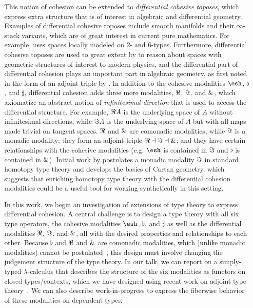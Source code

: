 \documentclass{article}
\begin{document}
This notion of cohesion can be extended to \emph{differential cohesive
  toposes}, which express extra structure that is of interest in
algebraic and differential geometry.  Examples of differential cohesive
toposes include smooth manifolds and their $\infty$-stack variants,
which are of great interest in current pure mathematics. For example,
\citet{SatiSchreiberStasheff2012} uses spaces locally modeled on 2- and
6-types.  Furthermore, differential cohesive toposes are used to great
extent by \citet{Schreiber2013} to reason about spaces with geometric
structures of interest to modern physics, and the differential part of
differential cohesion plays an important part in algebraic geometry, as
first noted in the form of an adjoint triple by \citet{SimpsonTeleman}.
In addition to the cohesive modalities $\shape$, $\flat$, and $\sharp$,
differential cohesion adds three more modalities, $\Re$, $\Im$, and
$\&$, which axiomatize an abstract notion of \emph{infinitesimal
  direction} that is used to access the differential structure.  For
example, $\Re A$ is the underlying space of $A$ without infinitesimal
directions, while $\Im A$ is the underlying space of $A$ but with all
maps made trivial on tangent spaces.  $\Re$ and $\&$ are comonadic
modalities, while $\Im$ is a monadic modality; they form an adjoint
triple $\Re \dashv \Im \dashv \&$; and they have certain
relationships with the cohesive modalities (e.g. $\shape$ is contained
in $\Im$ and $\flat$ is contained in $\&$).  Initial work by
\citet{Wellen2017} postulates a monadic modality $\Im$ in standard
homotopy type theory and develops the basics of Cartan geometry, which
suggests that enriching homotopy type theory with the differential
cohesion modalities could be a useful tool for working synthetically in
this setting.
 

In this work, we begin an investigation of extensions of type theory to
express differential cohesion.  A central challenge is to design a type
theory with all six type operators, the cohesive modalities $\shape$,
$\flat$, and $\sharp$ as well as the differential modalities $\Re$,
$\Im$, and $\&$, all with the desired properties and relationships
to each other.  Because $\flat$ and $\Re$ and $\&$ are comonadic
modalities, which (unlike monadic modalities) cannot be
postulated~\citep{Shulman2015}, this design must involve changing the
judgement structure of the type theory.  In our talk, we can report on a
simply-typed $\lambda$-calculus that describes the structure of the six
modalities as functors on closed types/contexts, which we have designed
using recent work on adjoint type theory~\citep{Licata2017}.  We can
also describe work-in-progress to express the fiberwise behavior of
these modalities on dependent types.
\end{document}
